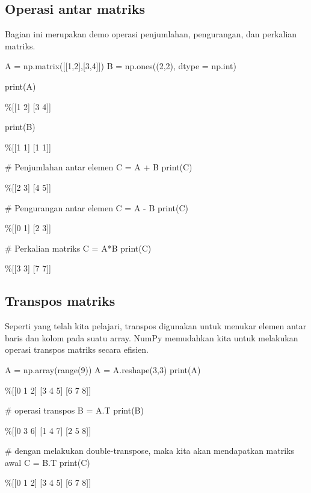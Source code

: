 \subsection{Operasi antar matriks}
Bagian ini merupakan demo operasi penjumlahan, pengurangan, dan perkalian matriks.
\begin{pyin}
A = np.matrix([[1,2],[3,4]])
B = np.ones((2,2), dtype = np.int)
\end{pyin}
\begin{pyin}
print(A)
\end{pyin}
\begin{pyout}
\%[[1 2]
 [3 4]]
\end{pyout}
\begin{pyin}
print(B)
\end{pyin}
\begin{pyout}
\%[[1 1]
 [1 1]]
\end{pyout}
\begin{pyin}
# Penjumlahan antar elemen
C = A + B
print(C)
\end{pyin}
\begin{pyout}
\%[[2 3]
 [4 5]]
\end{pyout}
\begin{pyin}
# Pengurangan antar elemen
C = A - B
print(C)
\end{pyin}
\begin{pyout}
\%[[0 1]
 [2 3]]
\end{pyout}
\begin{pyin}
# Perkalian matriks
C = A*B
print(C)
\end{pyin}
\begin{pyout}
\%[[3 3]
 [7 7]]
\end{pyout}
\subsection{Transpos matriks}
Seperti yang telah kita pelajari, transpos digunakan untuk menukar elemen antar baris dan kolom pada suatu array. NumPy memudahkan kita untuk melakukan operasi transpos matriks secara efisien.
\begin{pyin}
A = np.array(range(9))
A = A.reshape(3,3)
print(A)
\end{pyin}
\begin{pyout}
\%[[0 1 2]
 [3 4 5]
 [6 7 8]]
\end{pyout}
\begin{pyin}
# operasi transpos
B = A.T
print(B)
\end{pyin}
\begin{pyout}
\%[[0 3 6]
 [1 4 7]
 [2 5 8]]
\end{pyout}
\begin{pyin}
# dengan melakukan double-transpose, maka kita akan mendapatkan matriks awal
C = B.T
print(C)
\end{pyin}
\begin{pyout}
\%[[0 1 2]
 [3 4 5]
 [6 7 8]]
\end{pyout}
